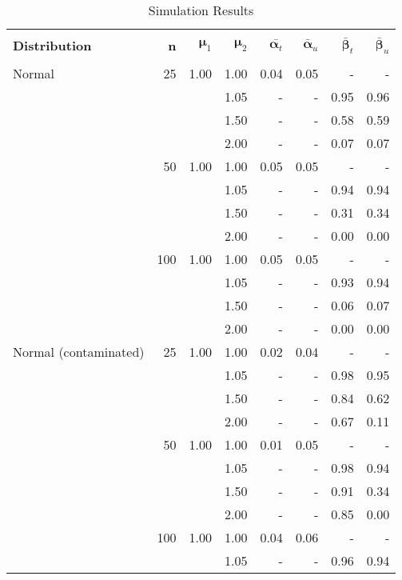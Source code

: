 \documentclass{report}
\begin{document}
\begin{table}[h!]
	\centering
	\caption{Simulation Results}
	\vspace{1em}
	\begin{threeparttable}
		\begin{tabular}{|l r r r r r r r|}
			\hline
			& & & & & & & \\
			\textbf{Distribution} & 
			\textbf{n} & 
			$\bm{\mu}_1$ &
			$\bm{\mu}_2$ &
			$\bar{\bm{\alpha}_t}$ & 
			$\bar{\bm{\alpha}}_u$ & 
			$\bar{\bm{\beta}}_t$ &
			$\bar{\bm{\beta}}_u$ \\

			& & & & & & & \\

			Normal &  25 & 1.00 & 1.00 & 0.04 & 0.05 & - & - \\ 
			&  & & 1.05 & - & - & 0.95 & 0.96 \\ 
			&  & & 1.50 & - & - & 0.58 & 0.59 \\ 
			&  & & 2.00 & - & - & 0.07 & 0.07 \\ 
			&  50 & 1.00 & 1.00 & 0.05 & 0.05 & - & - \\ 
			&  & & 1.05 & - & - & 0.94 & 0.94 \\ 
			&  & & 1.50 & - & - & 0.31 & 0.34 \\ 
			&  & & 2.00 & - & - & 0.00 & 0.00 \\ 
			& 100 & 1.00 & 1.00 & 0.05 & 0.05 & - & - \\ 
			& & & 1.05 & - & - & 0.93 & 0.94 \\ 
			& & & 1.50 & - & - & 0.06 & 0.07 \\ 
			& & & 2.00 & - & - & 0.00 & 0.00 \\ 
			Normal (contaminated) &  25 & 1.00 & 1.00 & 0.02 & 0.04
			& - & - \\ 
			&   & & 1.05 & - & - & 0.98 & 0.95 \\ 
			&   & & 1.50 & - & - & 0.84 & 0.62 \\ 
			&   & & 2.00 & - & - & 0.67 & 0.11 \\ 
			&  50 & 1.00 & 1.00 & 0.01 & 0.05 & - & - \\ 
			&   & & 1.05 & - & - & 0.98 & 0.94 \\ 
			&   & & 1.50 & - & - & 0.91 & 0.34 \\ 
			&   & & 2.00 & - & - & 0.85 & 0.00 \\ 
			& 100 & 1.00 & 1.00 & 0.04 & 0.06 & - & - \\ 
			&  & & 1.05 & - & - & 0.96 & 0.94 \\ 

\end{tabular}
\end{threeparttable}
\end{table}
\end{document}
